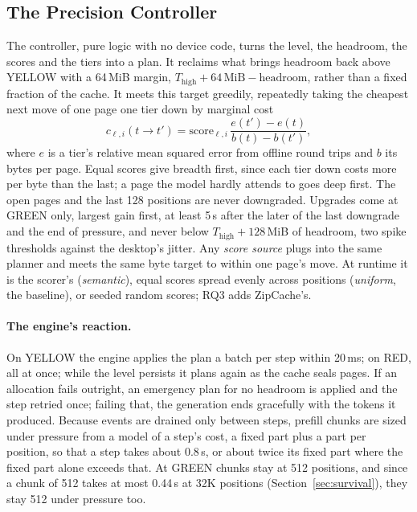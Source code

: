 \documentclass{article}
\begin{document}
\subsection{The Precision Controller}
\label{sec:controller}

The controller, pure logic with no device code, turns the level, the headroom,
the scores and the tiers into a plan. It reclaims what brings headroom back
above YELLOW with a 64\,MiB margin, $T_\mathrm{high} + 64\,\mathrm{MiB} -
\text{headroom}$, rather than a fixed fraction of the cache. It meets this
target greedily, repeatedly taking the cheapest next move of one page one tier
down by marginal cost
\begin{equation}
  c_{\ell,i}(t \to t') = \mathrm{score}_{\ell,i}\,
    \frac{e(t') - e(t)}{b(t) - b(t')},
  \label{eq:marginal}
\end{equation}
where $e$ is a tier's relative mean squared error from offline round trips and
$b$ its bytes per page. Equal scores give breadth first, since each tier down
costs more per byte than the last; a page the model hardly attends to goes deep
first. The open pages and the last 128 positions are never downgraded.
Upgrades come at GREEN only, largest gain first, at least 5\,s after the later
of the last downgrade and the end of pressure, and never below $T_\mathrm{high}
+ 128$\,MiB of headroom, two spike thresholds against the desktop's jitter.
Any \textit{score source} plugs into the same planner and meets the same byte target to within one page's move. At runtime it
is the scorer's (\textit{semantic}), equal scores spread evenly across positions
(\textit{uniform}, the baseline), or seeded random scores; RQ3 adds ZipCache's.

\paragraph{The engine's reaction.} On YELLOW the engine applies the plan a
batch per step within 20\,ms; on RED, all at once; while the level persists it
plans again as the cache seals pages. If an allocation fails outright, an
emergency plan for no headroom is applied and the step retried once; failing
that, the generation ends gracefully with the tokens it produced. Because events
are drained only between steps, prefill chunks are sized under pressure from a
model of a step's cost, a fixed part plus a part per position, so that a step
takes about 0.8\,s, or about twice its fixed part where the fixed part alone
exceeds that. At GREEN chunks stay at 512 positions, and since a chunk of 512
takes at most 0.44\,s at 32K positions (Section~\ref{sec:survival}), they stay
512 under pressure too.
\end{document}
